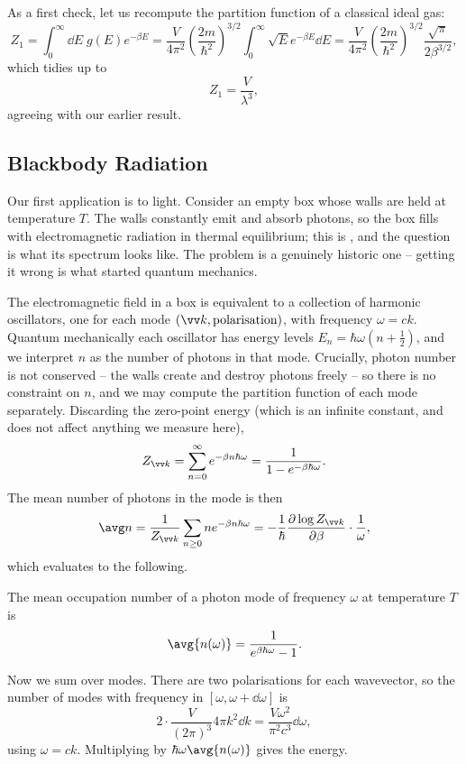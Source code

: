 As a first check, let us recompute the partition function of a classical ideal gas:
$$
Z_1 = \int_0^\infty \dd E\; g(E) e^{-\beta E} = \frac{V}{4\pi^2}\left(\frac{2m}{\hbar^2}\right)^{3/2}\int_0^\infty \sqrt E e^{-\beta E}\dd E = \frac{V}{4\pi^2}\left(\frac{2m}{\hbar^2}\right)^{3/2}\frac{\sqrt\pi}{2\beta^{3/2}},
$$
which tidies up to
$$
Z_1 = \frac{V}{\lambda^3},
$$
agreeing with our earlier result.

\subsection{Blackbody Radiation}\label{sec:blackbody}

Our first application is to light. Consider an empty box whose walls are held at temperature $T$. The walls constantly emit and absorb photons, so the box fills with electromagnetic radiation in thermal equilibrium; this is , and the question is what its spectrum looks like. The problem is a genuinely historic one -- getting it wrong is what started quantum mechanics.

The electromagnetic field in a box is equivalent to a collection of harmonic oscillators, one for each mode $(\vv k, \text{polarisation})$, with frequency $\omega = ck$. Quantum mechanically each oscillator has energy levels $E_n = \hbar\omega(n+\tfrac 12)$, and we interpret $n$ as the number of photons in that mode. Crucially, photon number is not conserved -- the walls create and destroy photons freely -- so there is no constraint on $n$, and we may compute the partition function of each mode separately. Discarding the zero-point energy (which is an infinite constant, and does not affect anything we measure here),
$$
Z_{\vv k} = \sum_{n=0}^\infty e^{-\beta n \hbar\omega} = \frac{1}{1 - e^{-\beta\hbar\omega}}.
$$
The mean number of photons in the mode is then
$$
\avg n = \frac{1}{Z_{\vv k}}\sum_{n\ge 0} n e^{-\beta n\hbar\omega} = -\frac{1}{\hbar}\frac{\partial \log Z_{\vv k}}{\partial\beta}\cdot\frac{1}{\omega},
$$
which evaluates to the following.

\begin{definition}
	The mean occupation number of a photon mode of frequency $\omega$ at temperature $T$ is
	$$
	\avg{n(\omega)} = \frac{1}{e^{\beta\hbar\omega}-1}.
	$$
\end{definition}

Now we sum over modes. There are two polarisations for each wavevector, so the number of modes with frequency in $[\omega, \omega+\dd\omega]$ is
$$
2 \cdot \frac{V}{(2\pi)^3}4\pi k^2 \dd k = \frac{V\omega^2}{\pi^2 c^3}\dd\omega,
$$
using $\omega = ck$. Multiplying by $\hbar\omega \avg{n(\omega)}$ gives the energy.

